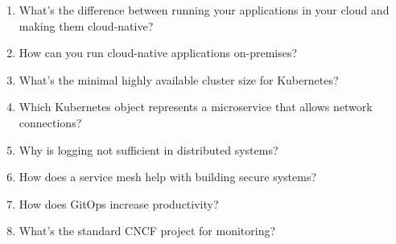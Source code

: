 \begin{enumerate}
\item
What's the difference between running your applications in your cloud and making them cloud-native?

\item
How can you run cloud-native applications on-premises?

\item
What's the minimal highly available cluster size for Kubernetes?

\item
Which Kubernetes object represents a microservice that allows network connections?

\item
Why is logging not sufficient in distributed systems?

\item
How does a service mesh help with building secure systems?

\item
How does GitOps increase productivity?

\item
What's the standard CNCF project for monitoring?
\end{enumerate}
